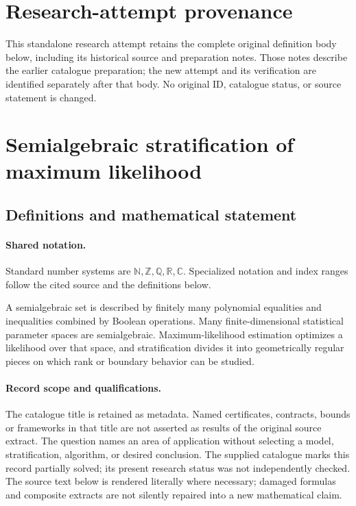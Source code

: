 \documentclass[11pt]{article}
\begin{document}
\section*{Research-attempt provenance}
This standalone research attempt retains the complete original definition body below,
including its historical source and preparation notes. Those notes describe the
earlier catalogue preparation; the new attempt and its verification are identified
separately after that body. No original ID, catalogue status, or source statement is changed.

\section{Semialgebraic stratification of maximum likelihood}\label{statement}

\subsection{Definitions and mathematical statement}

\paragraph{Shared notation.}Standard number systems are $\mathbb N,\mathbb Z,\mathbb Q,\mathbb R,\mathbb C$. Specialized notation and index ranges follow the cited source and the definitions below.


A semialgebraic set is described by finitely many polynomial equalities and inequalities combined by Boolean operations. Many finite-dimensional statistical parameter spaces are semialgebraic. Maximum-likelihood estimation optimizes a likelihood over that space, and stratification divides it into geometrically regular pieces on which rank or boundary behavior can be studied.
\paragraph{Record scope and qualifications.}
The catalogue title is retained as metadata. Named certificates, contracts, bounds or frameworks in that title are not asserted as results of the original source extract.
The question names an area of application without selecting a model, stratification, algorithm, or desired conclusion. The supplied catalogue marks this record partially solved; its present research status was not independently checked.
The source text below is rendered literally where necessary; damaged formulas and composite extracts are not silently repaired into a new mathematical claim.
\end{document}
